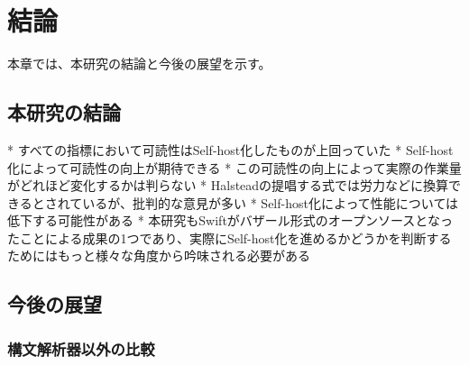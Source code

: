 \chapter{結論}
\label{conclusion}

本章では、本研究の結論と今後の展望を示す。

\section{本研究の結論}

* すべての指標において可読性はSelf-host化したものが上回っていた
* Self-host化によって可読性の向上が期待できる
* この可読性の向上によって実際の作業量がどれほど変化するかは判らない
* Halsteadの提唱する式では労力などに換算できるとされているが、批判的な意見が多い
* Self-host化によって性能については低下する可能性がある
* 本研究もSwiftがバザール形式のオープンソースとなったことによる成果の1つであり、実際にSelf-host化を進めるかどうかを判断するためにはもっと様々な角度から吟味される必要がある

%
%
%

\section{今後の展望}

\subsection{構文解析器以外の比較}

